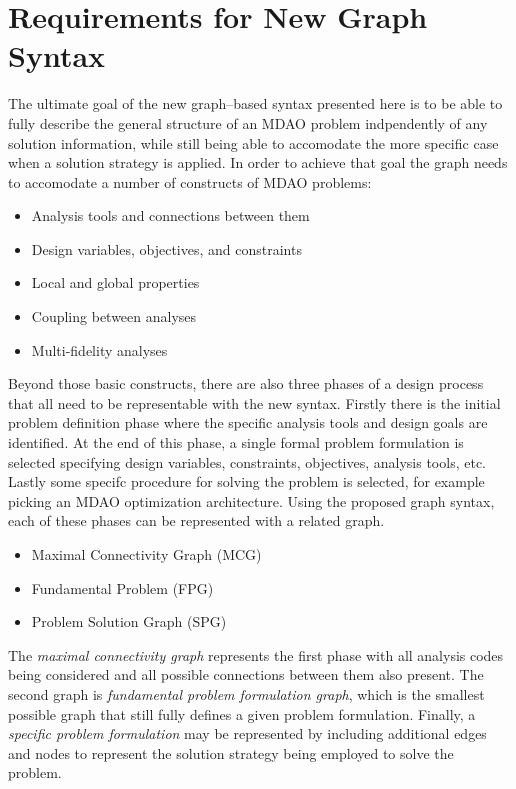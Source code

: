 \newcommand{\st}{ \ | \ }

\section{Requirements for New Graph Syntax}
The ultimate goal of the new graph--based syntax presented here is to be able to 
fully describe the general structure of an MDAO problem indpendently of any solution information, 
while still being able to accomodate the more specific case when a solution 
strategy is applied. In order to achieve that goal 
the graph needs to accomodate a number of constructs of MDAO problems: 

\begin{itemize}
    \item Analysis tools and connections between them
    \item Design variables, objectives, and constraints
    \item Local and global properties
    \item Coupling between analyses
    \item Multi-fidelity analyses
\end{itemize}

Beyond those basic constructs, there are also three phases of a design process that 
all need to be representable with the new syntax. Firstly there is the initial problem definition
phase where the specific analysis tools and design goals are identified. At the end of this phase, 
a single formal problem formulation is selected specifying design variables, constraints, objectives, 
analysis tools, etc. Lastly some specifc procedure for solving the problem is selected, for example 
picking an MDAO optimization architecture. Using the proposed graph syntax, each of these phases 
can be represented with a related graph. 

\begin{itemize}
    \item Maximal Connectivity Graph (MCG)
    \item Fundamental Problem  (FPG)
    \item Problem Solution Graph (SPG)
\end{itemize}

The \emph{maximal connectivity graph} represents the first phase with all 
analysis codes being considered and all possible connections between them also present. The second graph 
is \emph{fundamental problem formulation graph}, which is the smallest possible graph 
that still fully defines a given problem formulation. Finally, a \emph{specific problem formulation} 
may be represented by including additional edges and nodes to represent the 
solution strategy being employed to solve the problem. 


